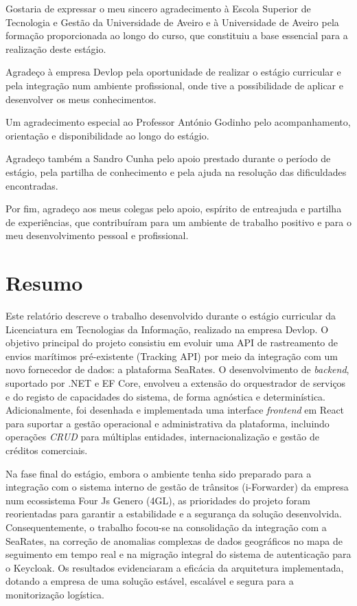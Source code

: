 \documentclass[a4paper,12pt]{report}
\begin{document}
Gostaria de expressar o meu sincero agradecimento à Escola Superior de Tecnologia e Gestão da Universidade de Aveiro e à Universidade de Aveiro pela formação proporcionada ao longo do curso, que constituiu a base essencial para a realização deste estágio.

Agradeço à empresa Devlop pela oportunidade de realizar o estágio curricular e pela integração num ambiente profissional, onde tive a possibilidade de aplicar e desenvolver os meus conhecimentos.

Um agradecimento especial ao Professor António Godinho pelo acompanhamento, orientação e disponibilidade ao longo do estágio.

Agradeço também a Sandro Cunha pelo apoio prestado durante o período de estágio, pela partilha de conhecimento e pela ajuda na resolução das dificuldades encontradas.

Por fim, agradeço aos meus colegas pelo apoio, espírito de entreajuda e partilha de experiências, que contribuíram para um ambiente de trabalho positivo e para o meu desenvolvimento pessoal e profissional.

\newpage

\chapter*{Resumo}

Este relatório descreve o trabalho desenvolvido durante o estágio curricular da Licenciatura em Tecnologias da Informação, realizado na empresa Devlop. O objetivo principal do projeto consistiu em evoluir uma API de rastreamento de envios marítimos pré-existente (Tracking API) por meio da integração com um novo fornecedor de dados: a plataforma SeaRates. O desenvolvimento de \textit{backend}, suportado por .NET e EF Core, envolveu a extensão do orquestrador de serviços e do registo de capacidades do sistema, de forma agnóstica e determinística. Adicionalmente, foi desenhada e implementada uma interface \textit{frontend} em React para suportar a gestão operacional e administrativa da plataforma, incluindo operações \textit{CRUD} para múltiplas entidades, internacionalização e gestão de créditos comerciais.

Na fase final do estágio, embora o ambiente tenha sido preparado para a integração com o sistema interno de gestão de trânsitos (i-Forwarder) da empresa num ecossistema Four Js Genero (4GL), as prioridades do projeto foram reorientadas para garantir a estabilidade e a segurança da solução desenvolvida. Consequentemente, o trabalho focou-se na consolidação da integração com a SeaRates, na correção de anomalias complexas de dados geográficos no mapa de seguimento em tempo real e na migração integral do sistema de autenticação para o Keycloak. Os resultados evidenciaram a eficácia da arquitetura implementada, dotando a empresa de uma solução estável, escalável e segura para a monitorização logística.
\end{document}
